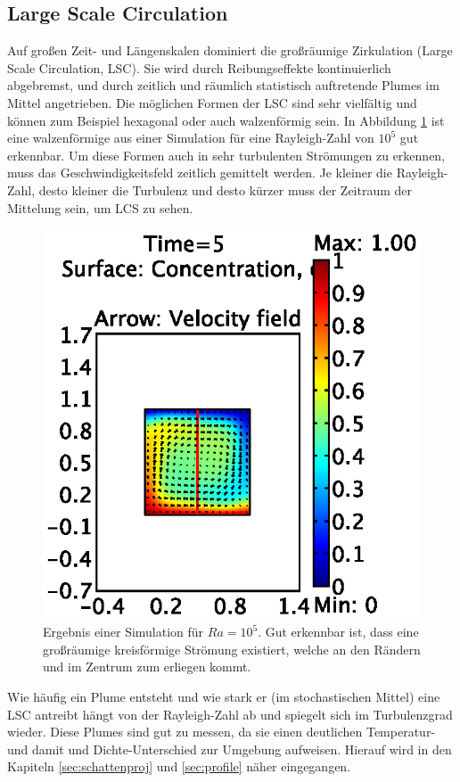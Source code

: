 \documentclass[12pt,a4paper,titlepage,headinclude]{scrartcl}
\numberwithin{equation}{subsection}
\begin{document}
\subsection{Large Scale Circulation}
Auf großen Zeit- und Längenskalen dominiert die großräumige Zirkulation (Large Scale Circulation, LSC).
Sie wird durch Reibungseffekte kontinuierlich abgebremst, und durch zeitlich und räumlich statistisch auftretende Plumes im Mittel angetrieben.
Die möglichen Formen der LSC sind sehr vielfältig und können zum Beispiel hexagonal oder auch walzenförmig sein.
In Abbildung \ref{fig:1e5_num} ist eine walzenförmige aus einer Simulation für eine Rayleigh-Zahl von $10^5$ gut erkennbar.
Um diese Formen auch in sehr turbulenten Strömungen zu erkennen, muss das Geschwindigkeitsfeld zeitlich gemittelt werden. 
Je kleiner die Rayleigh-Zahl, desto kleiner die Turbulenz und desto kürzer muss der Zeitraum der Mittelung sein, um LCS zu sehen.
\begin{figure}[!ht]
\centering
\includegraphics{1e5}
\caption{Ergebnis einer Simulation für $Ra=10^5$. Gut erkennbar ist, dass eine großräumige kreisförmige Strömung existiert, welche an den Rändern und im Zentrum zum erliegen kommt.}
\label{fig:1e5_num}
\end{figure}

Wie häufig ein Plume entsteht und wie stark er (im stochastischen Mittel) eine LSC antreibt hängt von der Rayleigh-Zahl ab und spiegelt sich im Turbulenzgrad wieder.
Diese Plumes sind gut zu messen, da sie einen deutlichen Temperatur- und damit und Dichte-Unterschied zur Umgebung aufweisen.
Hierauf wird in den Kapiteln \ref{sec:schattenproj} und \ref{sec:profile} näher eingegangen.
\end{document}
